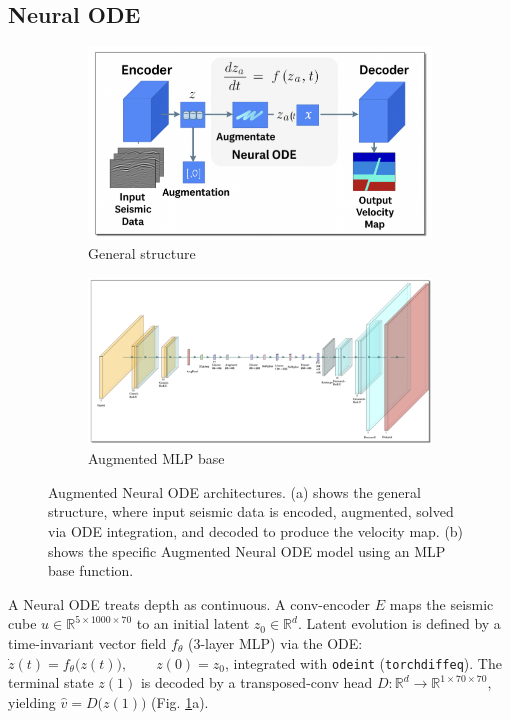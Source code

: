 \documentclass{article}
\begin{document}
\subsection{Neural ODE}
\begin{figure}
    \centering
    \begin{subfigure}[b]{0.47\linewidth}
        \centering
        \includegraphics[width=\linewidth]{figures/neuralode_structure.png}
        \caption{General structure}
    \end{subfigure}
    \hfill
    \begin{subfigure}[b]{0.47\linewidth}
        \centering
        \includegraphics[width=\linewidth]{figures/augmented_neuralode.png}
        \caption{Augmented MLP base}
    \end{subfigure}
    \caption{Augmented Neural ODE architectures. (a) shows the general structure, where input seismic data is encoded, augmented, solved via ODE integration, and decoded to produce the velocity map. (b) shows the specific Augmented Neural ODE model using an MLP base function.}
    \label{fig:neuralode-merged}
\end{figure}

A Neural ODE treats depth as continuous.  
A conv-encoder $E$ maps the seismic cube $u\!\in\!\mathbb R^{5\times1000\times70}$ to an
initial latent $z_0\in\mathbb R^{d}$.
Latent evolution is defined by a time-invariant vector field
$f_\theta$ (3-layer MLP) via the ODE: $\dot z(t)=f_\theta\!\bigl(z(t)\bigr),\qquad z(0)=z_0$, integrated with \texttt{odeint} (\texttt{torchdiffeq}).
The terminal state $z(1)$ is decoded by a transposed-conv head
$D:\mathbb R^{d}\!\to\!\mathbb R^{1\times70\times70}$,
yielding $\hat v=D\!\bigl(z(1)\bigr)$
(Fig. \ref{fig:neuralode-merged}a).
\end{document}

